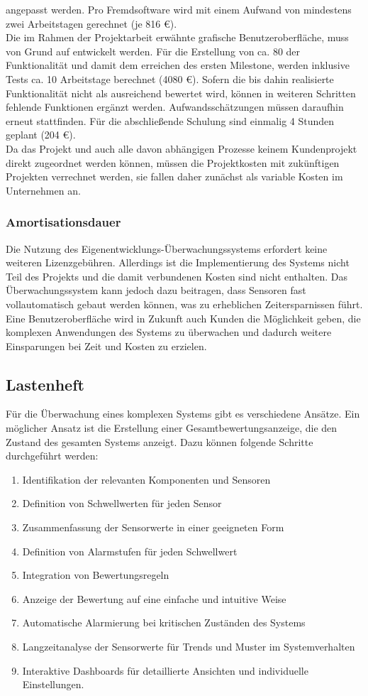\begin{flushleft}
angepasst werden. Pro Fremdsoftware wird mit einem Aufwand von mindestens zwei Arbeitstagen
gerechnet (je 816 €).\\
Die im Rahmen der Projektarbeit erwähnte grafische Benutzeroberfläche, muss von Grund auf entwickelt
werden. Für die Erstellung von ca. 80 der Funktionalität und damit dem erreichen des ersten Milestone,
werden inklusive Tests ca. 10 Arbeitstage berechnet (4080 €). Sofern die bis dahin realisierte
Funktionalität nicht als ausreichend bewertet wird, können in weiteren Schritten fehlende Funktionen
ergänzt werden. Aufwandsschätzungen müssen daraufhin erneut stattfinden.
Für die abschließende Schulung sind einmalig 4 Stunden geplant (204 €).\\
Da das Projekt und auch alle davon abhängigen Prozesse keinem Kundenprojekt direkt zugeordnet
werden können, müssen die Projektkosten mit zukünftigen Projekten verrechnet werden, sie fallen daher
zunächst als variable Kosten im Unternehmen an.

\subsubsection{Amortisationsdauer}
Die Nutzung des Eigenentwicklungs-Überwachungssystems erfordert keine weiteren Lizenzgebühren.
Allerdings ist die Implementierung des Systems nicht Teil des Projekts und die damit verbundenen Kosten sind nicht enthalten.
Das Überwachungssystem kann jedoch dazu beitragen, dass Sensoren fast vollautomatisch gebaut werden können, was zu erheblichen Zeitersparnissen führt.
Eine Benutzeroberfläche wird in Zukunft auch Kunden die Möglichkeit geben, die komplexen Anwendungen des Systems zu überwachen und dadurch weitere Einsparungen bei Zeit und Kosten zu erzielen.
\subsection{Lastenheft}
Für die Überwachung eines komplexen Systems gibt es verschiedene Ansätze. Ein möglicher Ansatz ist die Erstellung einer Gesamtbewertungsanzeige, die den Zustand des gesamten Systems anzeigt. Dazu können folgende Schritte durchgeführt werden:

\begin{enumerate}
\item Identifikation der relevanten Komponenten und Sensoren
\item Definition von Schwellwerten für jeden Sensor
\item Zusammenfassung der Sensorwerte in einer geeigneten Form
\item Definition von Alarmstufen für jeden Schwellwert
\item Integration von Bewertungsregeln
\item Anzeige der Bewertung auf eine einfache und intuitive Weise
\item Automatische Alarmierung bei kritischen Zuständen des Systems
\item Langzeitanalyse der Sensorwerte für Trends und Muster im Systemverhalten
\item Interaktive Dashboards für detaillierte Ansichten und individuelle Einstellungen.
\end{enumerate}


\end{flushleft}
